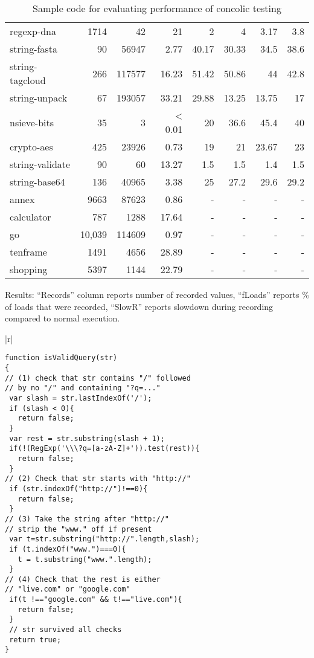\documentclass{sig-alternate}
\begin{document}
\begin{table*}
\begin{minipage}{0.6\textwidth}
{\begin{center}
\begin{tabular}{|l|r|r|r|r|r|r|r|}
regexp-dna& 1714 & 42 & 21 & 2 & 4 & 3.17 & 3.8\\
string-fasta& 90 & 56947 & 2.77 & 40.17 & 30.33 & 34.5 & 38.6\\
string-tagcloud& 266 & 117577 & 16.23 & 51.42 & 50.86 & 44 & 42.8\\
string-unpack& 67 & 193057 & 33.21 & 29.88 & 13.25 & 13.75 & 17\\
nsieve-bits& 35 & 3 & < 0.01 & 20 & 36.6 & 45.4 & 40 \\
crypto-aes& 425 & 23926 &0.73  & 19 & 21 & 23.67 & 23 \\
string-validate& 90 & 60 & 13.27 & 1.5 & 1.5 & 1.4 & 1.5\\
string-base64& 136 & 40965 & 3.38 & 25 & 27.2 & 29.6 & 29.2\\
\hline 
annex& 9663 & 87623 & 0.86 & - & - & - & - \\
calculator& 787 & 1288 & 17.64 & - & - & - & - \\
 go& 10,039 & 114609 & 0.97 & - & - & - & - \\
tenframe& 1491 &4656 & 28.89 & - & - & - & - \\
shopping& 5397 & 1144 & 22.79 & - & - & - & - \\
\hline 
\end{tabular}
\end{center}}
\caption{Results: ``Records'' column reports number of recorded values,
``fLoads'' reports \% of loads that were recorded, ``SlowR'' reports
slowdown during recording compared to normal execution.}
\label{tab:results}
\end{minipage}
\begin{minipage}{0.38\textwidth}
\begin{tabular}{|r|}
\hline\\
{\tiny
\begin{lstlisting}[mathescape]
function isValidQuery(str)
{
// (1) check that str contains "/" followed
// by no "/" and containing "?q=..."
 var slash = str.lastIndexOf('/');
 if (slash < 0){
   return false;
 }
 var rest = str.substring(slash + 1);
 if(!(RegExp('\\\?q=[a-zA-Z]+')).test(rest)){
   return false;
 }
// (2) Check that str starts with "http://"
 if (str.indexOf("http://")!==0){
   return false;
 }
// (3) Take the string after "http://"
// strip the "www." off if present
 var t=str.substring("http://".length,slash);
 if (t.indexOf("www.")===0){
   t = t.substring("www.".length);
 }
// (4) Check that the rest is either
// "live.com" or "google.com"
 if(t !=="google.com" && t!=="live.com"){
   return false;
 }
 // str survived all checks
 return true;
}

\end{lstlisting}
}\\
\hline
\end{tabular}
\caption{Sample code for evaluating performance of concolic testing}
\label{tab:conc}
\end{minipage}
\end{table*}
\end{document}
